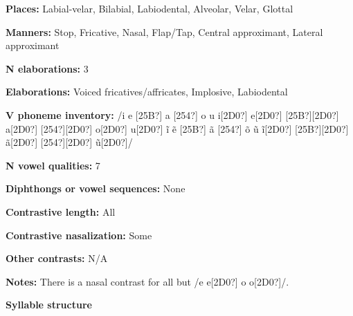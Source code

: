 \begin{styleBody}
\textbf{Places:} Labial-velar, Bilabial, Labiodental, Alveolar, Velar, Glottal
\end{styleBody}

\begin{styleBody}
\textbf{Manners:} Stop, Fricative, Nasal, Flap/Tap, Central approximant, Lateral approximant
\end{styleBody}

\begin{styleBody}
\textbf{N elaborations:} 3
\end{styleBody}

\begin{styleBody}
\textbf{Elaborations:} Voiced fricatives/affricates, Implosive, Labiodental
\end{styleBody}

\begin{styleBody}
\textbf{V phoneme inventory:} /i e [25B?] a [254?] o u i[2D0?] e[2D0?] [25B?][2D0?] a[2D0?] [254?][2D0?] o[2D0?] u[2D0?] \~{i} \~{e} [25B?] \~{a} [254?] \~{o} \~{u} \~{i}[2D0?] [25B?][2D0?] \~{a}[2D0?] [254?][2D0?] \~{u}[2D0?]/
\end{styleBody}

\begin{styleBody}
\textbf{N vowel qualities:} 7
\end{styleBody}

\begin{styleBody}
\textbf{Diphthongs or vowel sequences:} None
\end{styleBody}

\begin{styleBody}
\textbf{Contrastive length:} All
\end{styleBody}

\begin{styleBody}
\textbf{Contrastive nasalization:} Some
\end{styleBody}

\begin{styleBody}
\textbf{Other contrasts:} N/A
\end{styleBody}

\begin{styleBody}
\textbf{Notes:} There is a nasal contrast for all but /e e[2D0?] o o[2D0?]/.
\end{styleBody}

\begin{styleBody}
\textbf{Syllable structure}
\end{styleBody}

